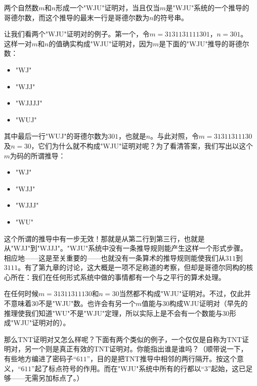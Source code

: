 \begin{block}
两个自然数$m$和$n$形成一个"WJU"证明对，当且仅当$m$是"WJU"系统的一个推导的哥德尔数，而这个推导的最末一行是哥德尔数为$n$的符号串。
\end{block}

让我们看两个"WJU"证明对的例子。第一个，令$m=3131131111301$，$n=301$。这样一对$m$和$n$的值确实构成"WJU"证明对，因为$m$是下面的"WJU"推导的哥德尔数：
\begin{itemize}
\item "WJ"
\item "WJJ"
\item "WJJJJ"
\item "WUJ"
\end{itemize}
其中最后一行"WUJ"的哥德尔数为$301$，也就是$n$。与此对照，令$m=31311311130$及$n=30$，它们为什么就不构成"WJU"证明对呢？为了看清答案，我们写出以这个$m$为码的所谓推导：
\begin{itemize}
\item "WJ"
\item "WJJ"
\item "WJJJ"
\item "WU"
\end{itemize}

这个所谓的推导中有一步无效！那就是从第二行到第三行，也就是从"WJJ"到"WJJJ"。"WJU"系统中没有一条推导规则能产生这样一个形式步骤。相应地——这是至关重要的——也就没有一条算术的推导规则能使我们从$311$到$3111$。有了第九章的讨论，这大概是一项不足称道的考察，但却是哥德尔同构的核心所在：我们在任何形式系统中做的事情都有一个与之平行的算术处理。

在任何时候$m=31311311130$和$n=30$当然都不构成"WJU"证明对。不过，仅此并不意味着$30$不是"WJU"数。也许会有另一个$m$值能与$30$构成WJU证明对（早先的推理使我们知道"WU"不是"WJU"定理，所以实际上是不会有一个数能与$30$形成"WJU"证明对的）。

那么TNT证明对又怎么样呢？下面有两个类似的例子，一个仅仅是自称为TNT证明对，另一个则是真正有效的TNT证明对。你能指出谁是谁吗？（顺带说一下，有些地方编进了密码子“$611$”，目的是把TNT推导中相邻的两行隔开。按这个意义，“$611$”起了标点符号的作用。而在"WJU"系统中所有的行都以“$3$”起始，这已足够——无需另加标点了。）

